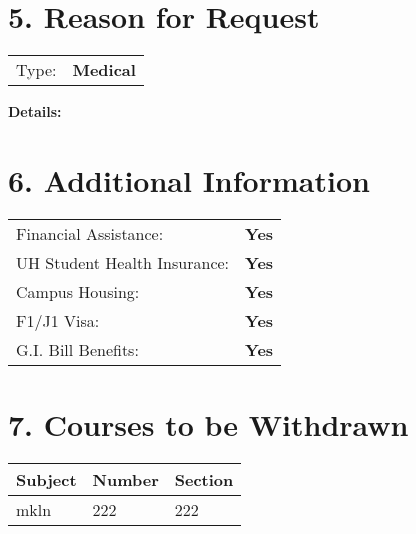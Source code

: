 \documentclass[12pt]{article}
\begin{document}
\vspace{0.5cm}

\section*{5. Reason for Request}
\begin{tabular}{ll}
Type: & \textbf{Medical} \\
\end{tabular}

\noindent\textbf{Details:}\\

\vspace{0.5cm}

\section*{6. Additional Information}
\begin{tabular}{ll}
Financial Assistance: & \textbf{Yes} \\
UH Student Health Insurance: & \textbf{Yes} \\
Campus Housing: & \textbf{Yes} \\
F1/J1 Visa: & \textbf{Yes} \\
G.I. Bill Benefits: & \textbf{Yes} \\
\end{tabular}

\vspace{0.5cm}

\section*{7. Courses to be Withdrawn}
\begin{tabular}{lll}
\textbf{Subject} & \textbf{Number} & \textbf{Section} \\
\hline
mkln  & 222 & 222 \\

\end{tabular}

\vspace{0.5cm}
\end{document}
